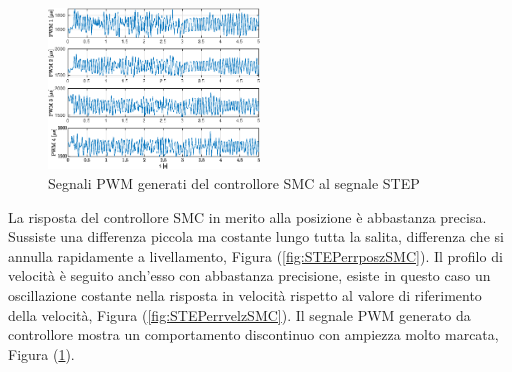 \begin{figure}
	\centering
	\includegraphics[width=0.5\textwidth]{Simulazioni/Figure/SMC/STEP/PWM}
	\caption{Segnali PWM generati del controllore SMC al segnale STEP}
	\label{fig:STEPPWMSMC}
\end{figure}

La risposta del controllore SMC in merito alla posizione è abbastanza precisa. Sussiste una differenza piccola ma costante lungo tutta la salita, differenza che si annulla rapidamente a livellamento, Figura (\ref{fig:STEPerrposzSMC}). Il profilo di velocità è seguito anch'esso con abbastanza precisione, esiste in questo caso un oscillazione costante nella risposta in velocità rispetto al valore di riferimento della velocità, Figura (\ref{fig:STEPerrvelzSMC}). Il segnale PWM generato da controllore mostra un comportamento discontinuo con ampiezza molto marcata, Figura (\ref{fig:STEPPWMSMC}).

